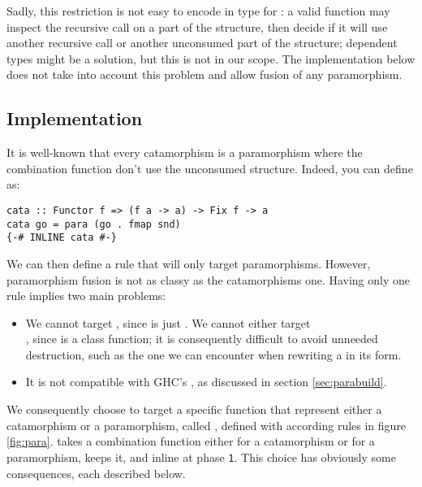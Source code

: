Sadly, this restriction is not easy to encode in type for : a valid function may inspect the recursive call on a part of the structure, then decide if it will use another recursive call or another unconsumed part of the structure; dependent types might be a solution, but this is not in our scope. The implementation below does not take into account this problem and allow fusion of any paramorphism.

\subsection{Implementation}
\label{sec:para-impl}

It is well-known that every catamorphism is a paramorphism where the combination function don't use the unconsumed structure. Indeed, you can define  as:
\begin{verbatim}
cata :: Functor f => (f a -> a) -> Fix f -> a
cata go = para (go . fmap snd)
{-# INLINE cata #-}
\end{verbatim}

\noindent We can then define a rule that will only target paramorphisms. However, paramorphism fusion is not as classy as the catamorphisms one. Having only one rule implies two main problems:
\begin{itemize}
\item We cannot target , since  is just . We cannot either target\\ , since  is a class function; it is consequently difficult to avoid unneeded destruction, such as the one we can encounter when rewriting a  in its  form.

\item It is not compatible with GHC's , as discussed in section \ref{sec:parabuild}.
\end{itemize}

We consequently choose to target a specific function that represent either a catamorphism or a paramorphism, called , defined with according rules in figure \ref{fig:para}.  takes a combination function either for a catamorphism or for a paramorphism, keeps it, and inline at phase \verb|1|.
This choice has obviously some consequences, each described below.

